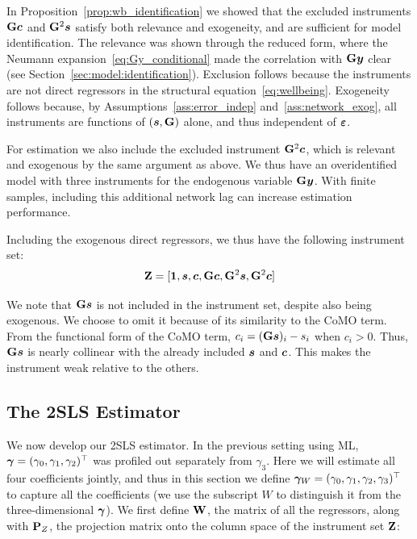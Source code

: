 In Proposition~\ref{prop:wb_identification} we showed that the excluded instruments $\mathbf{G}\bm{c}$ and $\mathbf{G}^2\bm{s}$ satisfy both relevance and exogeneity, and are sufficient for model identification. The relevance was shown through the reduced form, where the Neumann expansion~\eqref{eq:Gy_conditional} made the correlation with $\mathbf{G}\bm{y}$ clear (see Section~\ref{sec:model:identification}). Exclusion follows because the instruments are not direct regressors in the structural equation~\eqref{eq:wellbeing}. Exogeneity follows because, by Assumptions~\ref{ass:error_indep} and~\ref{ass:network_exog}, all instruments are functions of $(\bm{s}, \mathbf{G})$ alone, and thus independent of $\bm{\varepsilon}$.

For estimation we also include the excluded instrument $\mathbf{G}^2\bm{c}$, which is relevant and exogenous by the same argument as above. We thus have an overidentified model with three instruments for the endogenous variable $\mathbf{G}\bm{y}$. With finite samples, including this additional network lag can increase estimation performance.

Including the exogenous direct regressors, we thus have the following instrument set:
\begin{equation}
\label{eq:instrument_set}
    \mathbf{Z} = [\bm{1}, \bm{s}, \bm{c}, \mathbf{G}\bm{c},
    \mathbf{G}^2\bm{s}, \mathbf{G}^2\bm{c}]
\end{equation}

We note that $\mathbf{G}\bm{s}$ is not included in the instrument set, despite also being exogenous. We choose to omit it because of its similarity to the CoMO term. From the functional form of the CoMO term, $c_i = (\mathbf{G}\bm{s})_i - s_i$ when $c_i > 0$. Thus, $\mathbf{G}\bm{s}$ is nearly collinear with the already included $\bm{s}$ and $\bm{c}$. This makes the instrument weak relative to the others.

\subsection{The 2SLS Estimator}

We now develop our 2SLS estimator. In the previous setting using ML, $\bm{\gamma} = (\gamma_0, \gamma_1, \gamma_2)^\top$ was profiled out separately from $\gamma_3$. Here we will estimate all four coefficients jointly, and thus in this section we define $\bm{\gamma}_W = (\gamma_0, \gamma_1, \gamma_2, \gamma_3)^\top$ to capture all the coefficients (we use the subscript $W$ to distinguish it from the three-dimensional $\bm{\gamma}$). We first define $\mathbf{W}$, the matrix of all the regressors, along with $\mathbf{P}_Z$, the projection matrix onto the column space of the instrument set $\mathbf{Z}$:

